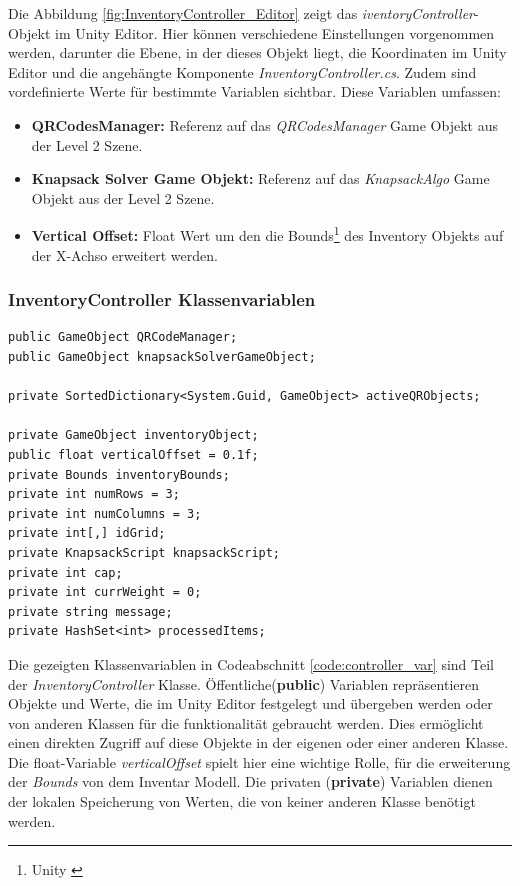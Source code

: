 Die Abbildung \ref{fig:InventoryController_Editor} zeigt das \textit{iventoryController}-Objekt im Unity Editor.  Hier
können verschiedene Einstellungen vorgenommen werden, darunter die Ebene, in der dieses Objekt liegt, die Koordinaten
im Unity Editor und die angehängte Komponente \textit{InventoryController.cs}. Zudem sind vordefinierte Werte für bestimmte
Variablen sichtbar. Diese Variablen umfassen:

\begin{itemize}
    \item \textbf{QRCodesManager:} Referenz auf das \textit{QRCodesManager} Game Objekt aus der Level 2 Szene.
    \item \textbf{Knapsack Solver Game Objekt:} Referenz auf das \textit{KnapsackAlgo} Game Objekt aus der Level 2 Szene.
    \item \textbf{Vertical Offset:} Float Wert um den die Bounds\footnote{Unity \cite{Bounds}} des Inventory Objekts auf der X-Achso erweitert werden.\\
\end{itemize}

\subsubsection{InventoryController Klassenvariablen}
\begin{lstlisting}[style=csharp, caption={Klassenvariablen der InventoryController Klasse}, label=code:controller_var]
public GameObject QRCodeManager;
public GameObject knapsackSolverGameObject;

private SortedDictionary<System.Guid, GameObject> activeQRObjects;

private GameObject inventoryObject;
public float verticalOffset = 0.1f;
private Bounds inventoryBounds;
private int numRows = 3;
private int numColumns = 3;
private int[,] idGrid;
private KnapsackScript knapsackScript;
private int cap;
private int currWeight = 0;
private string message;
private HashSet<int> processedItems;
\end{lstlisting}
Die gezeigten Klassenvariablen in Codeabschnitt \ref{code:controller_var} sind Teil der \textit{InventoryController} Klasse.
Öffentliche(\textbf{public}) Variablen repräsentieren Objekte und Werte, die im Unity Editor festgelegt und übergeben werden
oder von anderen Klassen für die funktionalität gebraucht werden. Dies ermöglicht einen direkten Zugriff auf diese Objekte in der
eigenen oder einer anderen Klasse. Die float-Variable \textit{verticalOffset} spielt hier eine
wichtige Rolle, für die erweiterung der \textit{Bounds} von dem Inventar Modell. Die privaten (\textbf{private}) Variablen dienen
der lokalen Speicherung von Werten, die von keiner anderen Klasse benötigt werden.\\

